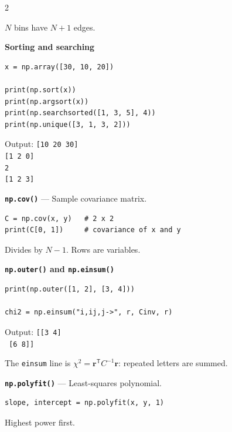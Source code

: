 \documentclass[10pt,a4paper]{article}
\begin{document}
\begin{multicols}{2}
\begin{card}
$N$ bins have $N+1$ edges.
\end{card}

\begin{card}
\textbf{Sorting and searching}

\begin{lstlisting}[style=pythonstyle]
x = np.array([30, 10, 20])

print(np.sort(x))
print(np.argsort(x))
print(np.searchsorted([1, 3, 5], 4))
print(np.unique([3, 1, 3, 2]))
\end{lstlisting}

Output:
\texttt{[10 20 30]}\\
\texttt{[1 2 0]}\\
\texttt{2}\\
\texttt{[1 2 3]}
\end{card}

\begin{card}
\textbf{\texttt{np.cov()}} --- Sample covariance matrix.

\begin{lstlisting}[style=pythonstyle]
C = np.cov(x, y)   # 2 x 2
print(C[0, 1])     # covariance of x and y
\end{lstlisting}

Divides by $N-1$. Rows are variables.
\end{card}

\begin{card}
\textbf{\texttt{np.outer()} and \texttt{np.einsum()}}

\begin{lstlisting}[style=pythonstyle]
print(np.outer([1, 2], [3, 4]))

chi2 = np.einsum("i,ij,j->", r, Cinv, r)
\end{lstlisting}

Output:
\texttt{[[3 4]}\\
\texttt{\ [6 8]]}

The \texttt{einsum} line is $\chi^2=\mathbf r^{\mathsf T}C^{-1}\mathbf r$:
repeated letters are summed.
\end{card}

\begin{card}
\textbf{\texttt{np.polyfit()}} --- Least-squares polynomial.

\begin{lstlisting}[style=pythonstyle]
slope, intercept = np.polyfit(x, y, 1)
\end{lstlisting}

Highest power first.
\end{card}


\end{multicols}
\end{document}
